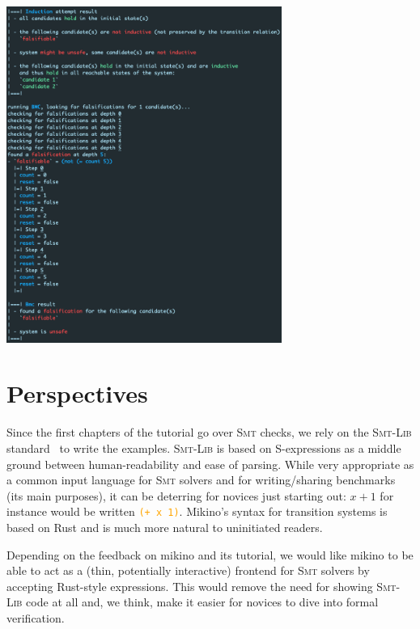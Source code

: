 \documentclass{easychair}
\newcommand{\Mkn}{Mikino}
\newcommand{\mkn}{mikino}
\newcommand{\smt}{\textsc{Smt}}
\newcommand{\smtlib}{\smt{}-\textsc{Lib}}
\newcommand{\code}[1]{\textcolor{orange}{\texttt{#1}}}
\newcommand{\picwidth}{9cm}
\begin{document}
\begin{center}
    \includegraphics[width=\picwidth]{../rsc/stopwatch_run_3.png}
\end{center}


\section{Perspectives}%
\label{app:perspectives}

Since the first chapters of the tutorial go over \smt{} checks, we rely on the \smtlib{}
standard~\cite{smtlib} to write the examples. \smtlib{} is based on S-expressions as a middle
ground between human-readability and ease of parsing. While very appropriate as a common input
language for \smt{} solvers and for writing/sharing benchmarks (its main purposes), it can be
deterring for novices just starting out: \(x + 1\) for instance would be written \code{(+ x 1)}.
\Mkn{}'s syntax for transition systems is based on Rust and is much more natural to uninitiated
readers.

Depending on the feedback on \mkn{} and its tutorial, we would like \mkn{} to be able to act as a
(thin, potentially interactive) frontend for \smt{} solvers by accepting Rust-style expressions.
This would remove the need for showing \smtlib{} code at all and, we think, make it easier for
novices to dive into formal verification.
\end{document}

